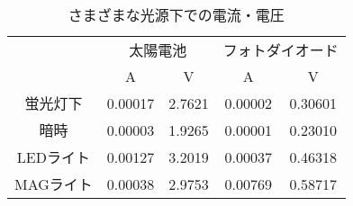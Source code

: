 \begin{table}[!htp]\centering
	\caption{さまざまな光源下での電流・電圧}\label{tab:exp1}
	\scriptsize
	\begin{tabular}{ccccc}\toprule
		       & \multicolumn{2}{c}{太陽電池} & \multicolumn{2}{c}{フォトダイオード}                     \\\cmidrule{2-5}
		       & A                        & V                            & A       & V       \\\midrule
		蛍光灯下   & 0.00017                  & 2.7621                       & 0.00002 & 0.30601 \\
		暗時     & 0.00003                  & 1.9265                       & 0.00001 & 0.23010 \\
		LEDライト & 0.00127                  & 3.2019                       & 0.00037 & 0.46318 \\
		MAGライト & 0.00038                  & 2.9753                       & 0.00769 & 0.58717 \\
		\bottomrule
	\end{tabular}
\end{table}
